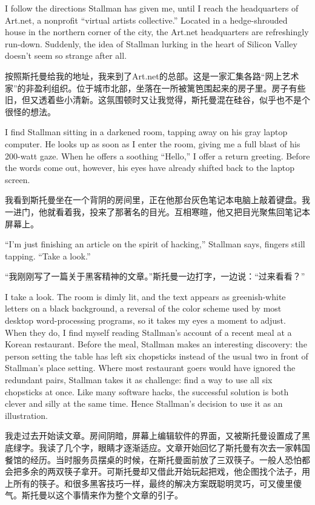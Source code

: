 \ifdefined\eng
I follow the directions Stallman has given me, until I reach the headquarters of Art.net, a nonprofit ``virtual artists collective.'' Located in a hedge-shrouded house in the northern corner of the city, the Art.net headquarters are refreshingly run-down. Suddenly, the idea of Stallman lurking in the heart of Silicon Valley doesn't seem so strange after all.
\fi

\ifdefined\chs
按照斯托曼给我的地址，我来到了Art.net的总部。这是一家汇集各路``网上艺术家''的非盈利组织。位于城市北部，坐落在一所被篱笆围起来的房子里。房子有些旧，但又透着些小清新。这氛围顿时又让我觉得，斯托曼混在硅谷，似乎也不是个很怪的想法。
\fi

\ifdefined\eng
I find Stallman sitting in a darkened room, tapping away on his gray laptop computer. He looks up as soon as I enter the room, giving me a full blast of his 200-watt gaze. When he offers a soothing ``Hello,'' I offer a return greeting. Before the words come out, however, his eyes have already shifted back to the laptop screen.
\fi

\ifdefined\chs
我看到斯托曼坐在一个背阴的房间里，正在他那台灰色笔记本电脑上敲着键盘。我一进门，他就看着我，投来了那著名的目光。互相寒暄，他又把目光聚焦回笔记本屏幕上。
\fi

\ifdefined\eng
``I'm just finishing an article on the spirit of hacking,'' Stallman says, fingers still tapping. ``Take a look.''
\fi

\ifdefined\chs
``我刚刚写了一篇关于黑客精神的文章。''斯托曼一边打字，一边说：``过来看看？''
\fi

\ifdefined\eng
I take a look. The room is dimly lit, and the text appears as greenish-white letters on a black background, a reversal of the color scheme used by most desktop word-processing programs, so it takes my eyes a moment to adjust. When they do, I find myself reading Stallman's account of a recent meal at a Korean restaurant. Before the meal, Stallman makes an interesting discovery: the person setting the table has left six chopsticks instead of the usual two in front of Stallman's place setting. Where most restaurant goers would have ignored the redundant pairs, Stallman takes it as challenge: find a way to use all six chopsticks at once. Like many software hacks, the successful solution is both clever and silly at the same time. Hence Stallman's decision to use it as an illustration.
\fi

\ifdefined\chs
我走过去开始读文章。房间阴暗，屏幕上编辑软件的界面，又被斯托曼设置成了黑底绿字。我读了几个字，眼睛才逐渐适应。文章开始回忆了斯托曼有次去一家韩国餐馆的经历。当时服务员摆桌的时候，在斯托曼面前放了三双筷子。一般人恐怕都会把多余的两双筷子拿开。可斯托曼却又借此开始玩起把戏，他企图找个法子，用上所有的筷子。和很多黑客技巧一样，最终的解决方案既聪明灵巧，可又傻里傻气。斯托曼以这个事情来作为整个文章的引子。
\fi

